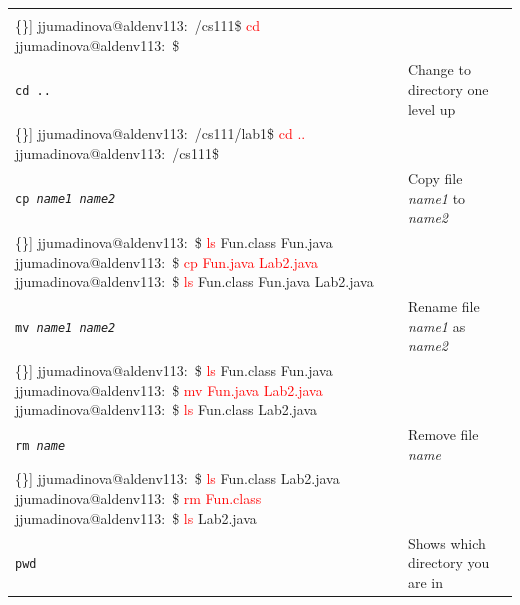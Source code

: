 \begin{table}[htbp]
\begin{tabular}{l|p{1.5in}|p{2.5in}}
\begin{minipage}{2.5in}
\begin{Verbatim}[commandchars=\\\{\}]
jjumadinova@aldenv113:~/cs111\$ \textcolor{red}{cd}
jjumadinova@aldenv113:~\$
\end{Verbatim}
\end{minipage}\\\hline
\rule{0em}{2.5em}\tt cd \verb$..$& Change to directory one level up&
\begin{minipage}{2.5in}
\begin{Verbatim}[commandchars=\\\{\}]
jjumadinova@aldenv113:~/cs111/lab1\$ \textcolor{red}{cd ..}
jjumadinova@aldenv113:~/cs111\$
\end{Verbatim}
\end{minipage}\\\hline
\rule{0em}{4.5em}\tt cp {\rm \em name1 name2} & Copy file {\em name1} to {\em name2}&
\begin{minipage}{2.5in}
\begin{Verbatim}[commandchars=\\\{\}]
jjumadinova@aldenv113:~\$ \textcolor{red}{ls}
Fun.class Fun.java
jjumadinova@aldenv113:~\$ \textcolor{red}{cp Fun.java Lab2.java}
jjumadinova@aldenv113:~\$ \textcolor{red}{ls}
Fun.class Fun.java Lab2.java
\end{Verbatim}
\end{minipage}\\\hline
\rule{0em}{4.5em}\tt mv {\rm \em name1 name2} & Rename file {\em name1} as {\em name2}&
\begin{minipage}{2.5in}
\begin{Verbatim}[commandchars=\\\{\}]
jjumadinova@aldenv113:~\$ \textcolor{red}{ls}
Fun.class Fun.java
jjumadinova@aldenv113:~\$ \textcolor{red}{mv Fun.java Lab2.java}
jjumadinova@aldenv113:~\$ \textcolor{red}{ls}
Fun.class Lab2.java
\end{Verbatim}
\end{minipage}\\\hline
\rule{0em}{4.5em}\tt rm {\rm \em name} & Remove file {\em name}&
\begin{minipage}{2.5in}
\begin{Verbatim}[commandchars=\\\{\}]
jjumadinova@aldenv113:~\$ \textcolor{red}{ls}
Fun.class Lab2.java
jjumadinova@aldenv113:~\$ \textcolor{red}{rm Fun.class}
jjumadinova@aldenv113:~\$ \textcolor{red}{ls}
Lab2.java
\end{Verbatim}
\end{minipage}\\
\hline
\rule{0em}{3.5em}\tt pwd & Shows which directory you are in &

\end{tabular}
\end{table}
